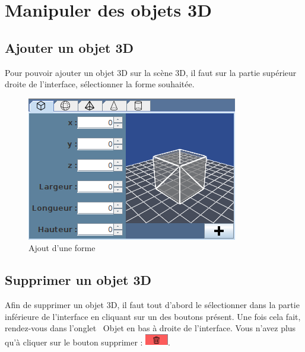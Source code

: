 \documentclass[11pt]{report}
\begin{document}
\chapter{Manipuler des objets 3D}

\section{Ajouter un objet 3D}
Pour pouvoir ajouter un objet 3D sur la scène 3D, il faut sur la partie supérieur droite de l'interface, sélectionner la forme souhaitée.
\newline


\begin{figure}[h]
  \centering
  \includegraphics[scale=0.75]{./ajoutFormes.png}
  \caption{Ajout d'une forme}
\end{figure}

\section{Supprimer un objet 3D}

Afin de supprimer un objet 3D, il faut tout d'abord le sélectionner dans la partie inférieure de l'interface en cliquant sur un des boutons
présent. Une fois cela fait, rendez-vous dans l'onglet \flqq\ Objet \frqq en bas à droite de l'interface. Vous n'avez plus qu'à cliquer sur le
bouton supprimer : \includegraphics[width=1cm]{./btn_supprimer.png}.
\end{document}

